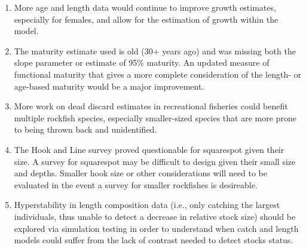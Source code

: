\documentclass[11pt,
  english,
  a4paper,
]{article}
\begin{document}
\begin{enumerate}
\def\labelenumi{\arabic{enumi}.}
\item

  More age and length data would continue to improve growth estimates, especially for females, and allow for the estimation of growth within the model.

  \tagmcend\tagstructend\tagstructend
\item

  The maturity estimate used is old (30+ years ago) and was missing both the slope parameter or estimate of 95\% maturity. An updated measure of functional maturity that gives a more complete consideration of the length- or age-based maturity would be a major improvement.

  \tagmcend\tagstructend\tagstructend
\item

  More work on dead discard estimates in recreational fisheries could benefit multiple rockfish species, especially smaller-sized species that are more prone to being thrown back and unidentified.

  \tagmcend\tagstructend\tagstructend
\item

  The Hook and Line survey proved questionable for squarespot given their size. A survey for squarespot may be difficult to design given their small size and depths. Smaller hook size or other considerations will need to be evaluated in the event a survey for smaller rockfishes is desireable.

  \tagmcend\tagstructend\tagstructend
\item

  Hyperstability in length composition data (i.e., only catching the largest individuals, thus unable to detect a decrease in relative stock size) should be explored via simulation testing in order to understand when catch and length models could suffer from the lack of contrast needed to detect stocks status.

  \tagmcend\tagstructend\tagstructend
\end{enumerate}

\tagstructend
\end{document}
